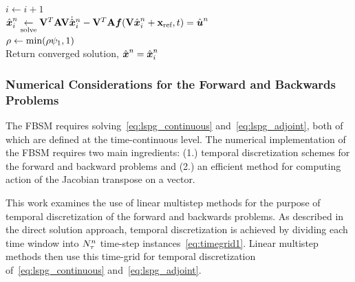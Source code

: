 \begin{algorithm}
{$i \leftarrow i+1$ \\
$\genstateArgnt{n}_i \solveAlgo \basisspace^T \stweightingMatArg{n} \basisspace \genstateDotArgnt{n}_i   -  \basisspace^T \stweightingMatArg{n} \velocity(\basisspace \genstate^n_i + \stateIntercept,t) =  \controllerArgnt{n} $
\\
{
$\rho \leftarrow \text{min}(\rho \fbsmGrowth,1)$ \\
}
}
Return converged solution, $\genstateArgnt{n}= \genstateArgnt{n}_i$
\end{algorithm}
\subsubsection{Numerical Considerations for the Forward and Backwards Problems}
The FBSM requires solving~\eqref{eq:lspg_continuous} and~\eqref{eq:lspg_adjoint}, both of which are defined at the time-continuous level. 
The numerical implementation of the FBSM requires two main ingredients: (1.) temporal discretization schemes for the forward and backward problems and (2.) 
an efficient method for computing action of the Jacobian transpose on a vector.  

This work examines the use of linear multistep methods for the purpose of temporal discretization of the forward and 
backwards problems. As described in  
the direct solution approach, temporal discretization is achieved by dividing each time window into $\nstepsArg{n}$ time-step instances~\eqref{eq:timegrid1}. Linear multistep methods then use this time-grid for temporal discretization of~\eqref{eq:lspg_continuous} and~\eqref{eq:lspg_adjoint}. 

